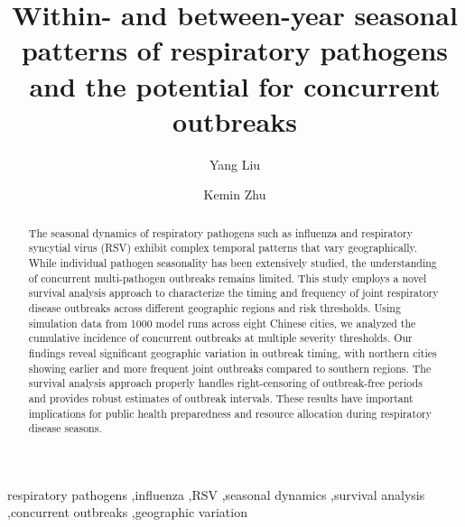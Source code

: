 \documentclass[preprint,12pt]{elsarticle}
\begin{document}
\begin{frontmatter}

\title{Within- and between-year seasonal patterns of respiratory pathogens and the potential for concurrent outbreaks}

\author[inst1]{Yang Liu}

\author[inst2]{Kemin Zhu}

\address[inst1]{Department of Infectious Disease Epidemiology, London School of Hygiene \& Tropical Medicine, Keppel Street, London WC1E 7HT, United Kingdom}
\address[inst2]{Department of Public Health, University Name, City, Country}

\begin{abstract}

The seasonal dynamics of respiratory pathogens such as influenza and respiratory syncytial virus (RSV) exhibit complex temporal patterns that vary geographically. While individual pathogen seasonality has been extensively studied, the understanding of concurrent multi-pathogen outbreaks remains limited. This study employs a novel survival analysis approach to characterize the timing and frequency of joint respiratory disease outbreaks across different geographic regions and risk thresholds. Using simulation data from 1000 model runs across eight Chinese cities, we analyzed the cumulative incidence of concurrent outbreaks at multiple severity thresholds. Our findings reveal significant geographic variation in outbreak timing, with northern cities showing earlier and more frequent joint outbreaks compared to southern regions. The survival analysis approach properly handles right-censoring of outbreak-free periods and provides robust estimates of outbreak intervals. These results have important implications for public health preparedness and resource allocation during respiratory disease seasons.
\end{abstract}

\begin{keyword}
respiratory pathogens \sep influenza \sep RSV \sep seasonal dynamics \sep survival analysis \sep concurrent outbreaks \sep geographic variation
\end{keyword}

\end{frontmatter}
\end{document}
